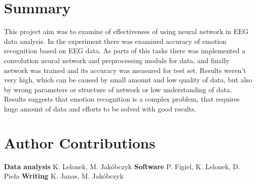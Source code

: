 \documentclass[10pt,journal,compsoc]{IEEEtran}
\begin{document}
\section{Summary}
This project aim was to examine of  effectiveness of using neural network in EEG data analysis. In the experiment there was examined accuracy of emotion recognition based on EEG data. As parts of this tasks there was implemented a convolution neural network and preprocessing module for data, and finally network was trained and its accuracy was measured for test set. Results weren't very high, which can be caused by small amount and low quality of data, but also by wrong parameters or structure of network or low understanding of data. Results suggests that emotion recognition is a complex problem, that requires huge amount of data and efforts to be solved with good results.



%


\appendices
\section{Author Contributions}
\textbf{Data analysis} K. Lelonek, M. Jakóbczyk \hfill \break
\textbf{Software} P. Figiel, K. Lelonek, D. Pieła \hfill \break
\textbf{Writing} K. Janas, M. Jakóbczyk \hfill \break
\end{document}
